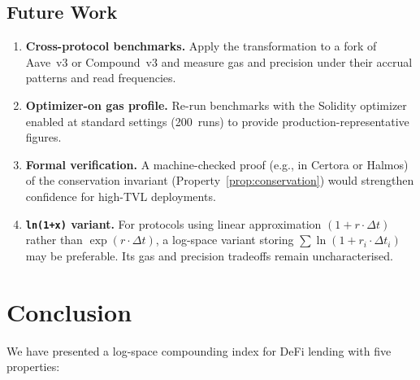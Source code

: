 \documentclass[10pt,a4paper,twocolumn]{article}
\begin{document}
\subsection{Future Work}
\label{subsec:future-work}

\begin{enumerate}[leftmargin=*, nosep]
\item \textbf{Cross-protocol benchmarks.} Apply the transformation to a fork of Aave~v3 or Compound~v3 and measure gas and precision under their accrual patterns and read frequencies.

\item \textbf{Optimizer-on gas profile.} Re-run benchmarks with the Solidity optimizer enabled at standard settings (200~runs) to provide production-representative figures.

\item \textbf{Formal verification.} A machine-checked proof (e.g., in Certora or Halmos) of the conservation invariant (Property~\ref{prop:conservation}) would strengthen confidence for high-TVL deployments.

\item \textbf{\texttt{ln(1+x)} variant.} For protocols using linear approximation $(1 + r \cdot \Delta t)$ rather than $\exp(r \cdot \Delta t)$, a log-space variant storing $\sum \ln(1 + r_i \cdot \Delta t_i)$ may be preferable. Its gas and precision tradeoffs remain uncharacterised.
\end{enumerate}

\section{Conclusion}
\label{sec:conclusion}

We have presented a log-space compounding index for DeFi lending with five properties:
\end{document}
